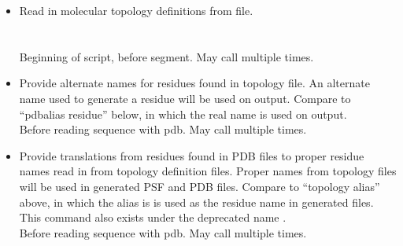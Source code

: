 \begin{itemize}

\item {}
{Read in molecular topology definitions from file.}
{\\
\\
\\
}
{Beginning of script, before segment.  May call multiple times.}

\item {}
{Provide alternate names for residues found in topology file.
An alternate name used to generate a residue will be used on output.
Compare to ``pdbalias residue'' below, in which the real name
is used on output.}
{\\
}
{Before reading sequence with pdb.  May call multiple times.}

\item {}
{Provide translations from residues found in PDB files to proper
residue names read in from topology definition files.  Proper names
from topology files will be used in generated PSF and PDB files.
Compare to ``topology alias'' above, in which the alias is
is used as the residue name in generated files.
This command also exists under the deprecated name .}
{\\
}
{Before reading sequence with pdb.  May call multiple times.}


\end{itemize}
